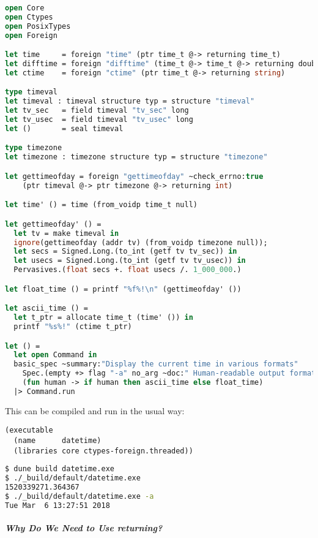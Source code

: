 \begin{lstlisting}[language=Caml]
open Core
open Ctypes
open PosixTypes
open Foreign

let time     = foreign "time" (ptr time_t @-> returning time_t)
let difftime = foreign "difftime" (time_t @-> time_t @-> returning double)
let ctime    = foreign "ctime" (ptr time_t @-> returning string)

type timeval
let timeval : timeval structure typ = structure "timeval"
let tv_sec   = field timeval "tv_sec" long
let tv_usec  = field timeval "tv_usec" long
let ()       = seal timeval

type timezone
let timezone : timezone structure typ = structure "timezone"

let gettimeofday = foreign "gettimeofday" ~check_errno:true
    (ptr timeval @-> ptr timezone @-> returning int)

let time' () = time (from_voidp time_t null)

let gettimeofday' () =
  let tv = make timeval in
  ignore(gettimeofday (addr tv) (from_voidp timezone null));
  let secs = Signed.Long.(to_int (getf tv tv_sec)) in
  let usecs = Signed.Long.(to_int (getf tv tv_usec)) in
  Pervasives.(float secs +. float usecs /. 1_000_000.)

let float_time () = printf "%f%!\n" (gettimeofday' ())

let ascii_time () =
  let t_ptr = allocate time_t (time' ()) in
  printf "%s%!" (ctime t_ptr)

let () =
  let open Command in
  basic_spec ~summary:"Display the current time in various formats"
    Spec.(empty +> flag "-a" no_arg ~doc:" Human-readable output format")
    (fun human -> if human then ascii_time else float_time)
  |> Command.run
\end{lstlisting}

This can be compiled and run in the usual way:

\begin{lstlisting}
(executable
  (name      datetime)
  (libraries core ctypes-foreign.threaded))
\end{lstlisting}

\begin{lstlisting}[language=bash]
$ dune build datetime.exe
$ ./_build/default/datetime.exe
1520339271.364367
$ ./_build/default/datetime.exe -a
Tue Mar  6 13:27:51 2018
\end{lstlisting}

\hypertarget{why-do-we-need-to-use-returning}{%
\subparagraph{Why Do We Need to Use
returning?}\label{why-do-we-need-to-use-returning}}

